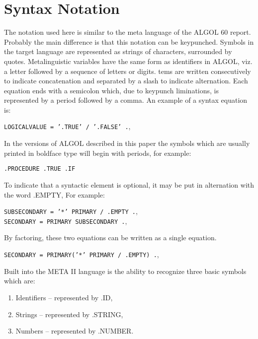 \documentclass[twocolumn]{article}
\begin{document}
\section{Syntax Notation}

The notation used here is similar to the meta language of the ALGOL 60 report.
Probably the main difference is that this notation can be keypunched.
Symbols in the target language are represented as strings of characters,
surrounded by quotes.
Metalinguistic variables have the same form as identifiers in ALGOL, viz. a
letter followed by a sequence of letters or digits.
tems are written consecutively to indicate concatenation and separated by a
slash to indicate alternation. Each equation ends with a semicolon which,
due to keypunch liminations, is represented by a period followed by a comma.
An example of a syntax equation is:

\begin{center}
{\tt LOGICALVALUE = '.TRUE' / '.FALSE' .},
\end{center}

In the versions of ALGOL described in this paper the symbols which are usually
printed in boldface type will begin with periods, for example:

\begin{center}
{\tt .PROCEDURE .TRUE .IF }
\end{center}

To indicate that a syntactic element is optional, it may be put in alternation
with the word .EMPTY, For example:

\begin{center}
{\tt SUBSECONDARY = '*' PRIMARY / .EMPTY .}, \\
{\tt SECONDARY = PRIMARY SUBSECONDARY .},
\end{center}

By factoring, these two equations can be written as a single equation.

\begin{center}
{\tt SECONDARY = PRIMARY('*' PRIMARY / .EMPTY) .},
\end{center}

Built into the META II language is the ability to recognize three basic symbols
which are: 

\begin{enumerate}
\item Identifiers -- represented by .ID,
\item Strings -- represented by .STRING,
\item Numbers -- represented by .NUMBER.
\end{enumerate}
\end{document}
